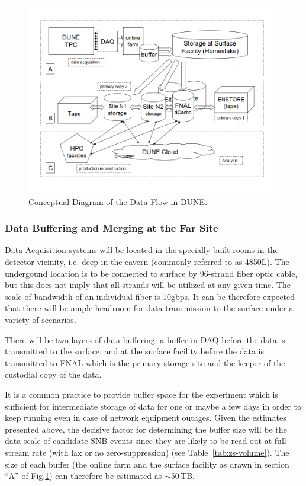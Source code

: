 \begin{figure}[h!]
\centering
\includegraphics[width=\textwidth]{DUNEdataflow.png}
\caption{Conceptual Diagram of the Data Flow in DUNE.}
\label{fig:DUNEdataflow}
\end{figure}

\subsubsection{Data Buffering and Merging at the Far Site}
Data Acquisition systems will be located in the specially built rooms in the detector vicinity, i.e. deep in the cavern (commonly referred to as 4850L).
The undergound location is to be connected to surface by 96-strand fiber optic cable, but this does not imply that all strands will be
utilized at any given time. The scale of bandwidth of an individual fiber is 10gbps. It can be therefore expected that there will be ample headroom
for data transmission to the surface under a variety of scenarios.

There will be two layers of data buffering: a buffer in DAQ before the data is transmitted to the surface,
and at the surface facility before the data is transmitted to FNAL which is the primary storage site and the
keeper of the custodial copy of the data.

It is a common practice to provide buffer space for the experiment which is sufficient for intermediate storage of data
for one or maybe a few days in order to keep running even in case of network equipment outages. Given the estimates
presented above, the decisive factor for determining the buffer size will be the data scale of candidate SNB events since
they are likely to be read out at full-stream rate (with lax or no zero-suppression) (see Table~\ref{tab:zs-volume}). The
size of each buffer (the online farm and the surface facility as drawn in section ``A'' of Fig.\ref{fig:DUNEdataflow})
can therefore be estimated as $\sim$50\,TB.

